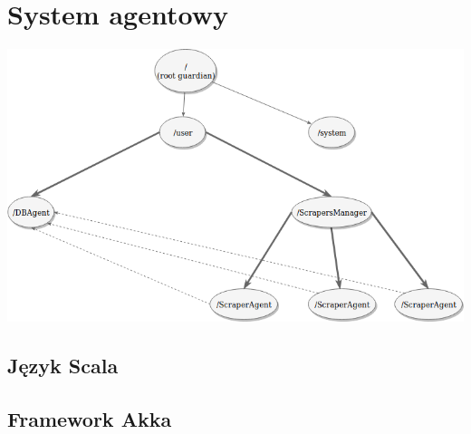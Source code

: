 \section{System agentowy}
\includegraphics[width=1.0\textwidth]{./pict/actors.png}


\subsection{Język Scala}

\subsection{Framework Akka}